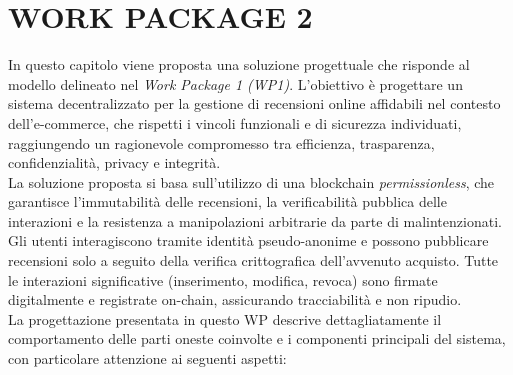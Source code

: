 \chapter{WORK PACKAGE 2}
    In questo capitolo viene proposta una soluzione progettuale che risponde al modello delineato nel \textit{Work Package 1 (WP1)}. L'obiettivo è progettare un sistema decentralizzato per la gestione di recensioni online affidabili nel contesto dell’e-commerce, che rispetti i vincoli funzionali e di sicurezza individuati, raggiungendo un ragionevole compromesso tra efficienza, trasparenza, confidenzialità, privacy e integrità. \\
    La soluzione proposta si basa sull'utilizzo di una blockchain \textit{permissionless}, che garantisce l'immutabilità delle recensioni, la verificabilità pubblica delle interazioni e la resistenza a manipolazioni arbitrarie da parte di malintenzionati. Gli utenti interagiscono tramite identità pseudo-anonime e possono pubblicare recensioni solo a seguito della verifica crittografica dell'avvenuto acquisto. Tutte le interazioni significative (inserimento, modifica, revoca) sono firmate digitalmente e registrate on-chain, assicurando tracciabilità e non ripudio. \\
    La progettazione presentata in questo WP descrive dettagliatamente il comportamento delle parti oneste coinvolte e i componenti principali del sistema, con particolare attenzione ai seguenti aspetti:
